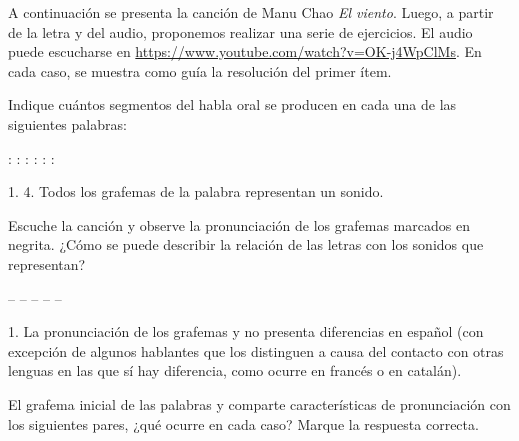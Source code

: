 \begin{ejercicio}\label{ej:03-viento}
A continuación se presenta la canción de Manu Chao \textit{El viento}. Luego, a
partir de la letra y del audio, proponemos realizar una serie de ejercicios. El
audio puede escucharse en \url{https://www.youtube.com/watch?v=OK-j4WpClMs}. En
cada caso, se muestra como guía la resolución del primer ítem.


\begin{consignas}
  \item Indique cuántos segmentos del habla oral se producen en cada una de las
        siguientes palabras:
        \begin{exe}
          \ex {}: 
          \ex {}:
          \ex {}:
          \ex {}:
          \ex {}:
          \ex {}:
        \end{exe}
        \begin{resuelto}
        1. 4. Todos los grafemas de la palabra representan un sonido.
        \end{resuelto}
  \item Escuche la canción y observe la pronunciación de los grafemas marcados
        en negrita. ¿Cómo se puede describir la relación de las letras con los
        sonidos que representan?
        \begin{exe}
          \ex {} -- 
          \ex {} --  -- 
          \ex {} -- 
          \ex {} -- 
        \end{exe}
        \begin{resuelto}
        1. La pronunciación de los grafemas  y  no presenta
        diferencias en español (con excepción de algunos hablantes que los
        distinguen a causa del contacto con otras lenguas en las que sí hay
        diferencia, como ocurre en francés o en catalán).
        \end{resuelto}
  \item El grafema inicial de las palabras  y 
        comparte características de pronunciación con los siguientes pares,
        ¿qué ocurre en cada caso? Marque la respuesta correcta.


\end{consignas}
\end{ejercicio}
